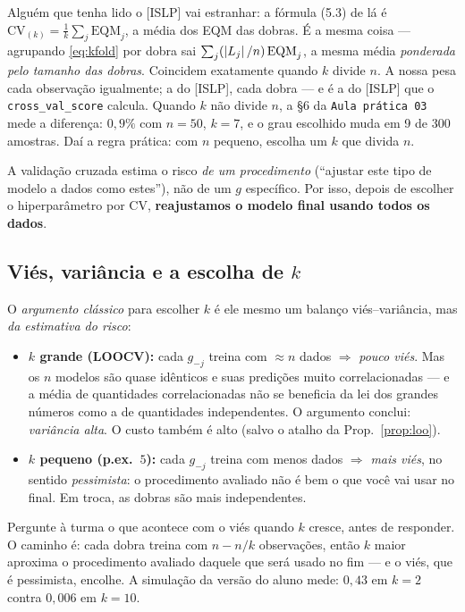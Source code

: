 \documentclass[11pt,a4paper]{article}
\begin{document}
\begin{emsala}
Alguém que tenha lido o [ISLP] vai estranhar: a fórmula (5.3) de lá é
$\mathrm{CV}_{(k)}=\frac1k\sum_j \mathrm{EQM}_j$, a média dos EQM das dobras. É a
mesma coisa --- agrupando \eqref{eq:kfold} por dobra sai
$\sum_j (\left\lvert L_j \right\rvert/n)\,\mathrm{EQM}_j$, a mesma média \emph{ponderada pelo tamanho
das dobras}. Coincidem exatamente quando $k$ divide $n$. A nossa pesa cada
observação igualmente; a do [ISLP], cada dobra --- e é a do [ISLP] que o
\texttt{cross\_val\_score} calcula. Quando $k$ não divide $n$, a §6 da
\texttt{Aula prática 03} mede a diferença: $0{,}9\%$ com $n=50$, $k=7$, e o grau
escolhido muda em 9 de 300 amostras. Daí a regra prática: com $n$ pequeno, escolha
um $k$ que divida $n$.
\end{emsala}

\begin{ideia}
A validação cruzada estima o risco \emph{de um procedimento} (``ajustar este tipo
de modelo a dados como estes''), não de um $g$ específico. Por isso, depois de
escolher o hiperparâmetro por CV, \textbf{reajustamos o modelo final usando todos
os dados}.
\end{ideia}

\subsection{Viés, variância e a escolha de $k$}
O \emph{argumento clássico} para escolher $k$ é ele mesmo um balanço
viés--variância, mas \emph{da estimativa do risco}:
\begin{itemize}[leftmargin=1.4cm]
  \item \textbf{$k$ grande (LOOCV):} cada $g_{-j}$ treina com $\approx n$ dados
        $\Rightarrow$ \emph{pouco viés}. Mas os $n$ modelos são quase idênticos e
        suas predições muito correlacionadas --- e a média de quantidades
        correlacionadas não se beneficia da lei dos grandes números como a de
        quantidades independentes. O argumento conclui: \emph{variância alta}.
        O custo também é alto (salvo o atalho da Prop.~\ref{prop:loo}).
  \item \textbf{$k$ pequeno (p.ex.\ $5$):} cada $g_{-j}$ treina com menos dados
        $\Rightarrow$ \emph{mais viés}, no sentido \emph{pessimista}: o procedimento
        avaliado não é bem o que você vai usar no final. Em troca, as dobras são
        mais independentes.
\end{itemize}

\begin{emsala}
Pergunte à turma o que acontece com o viés quando $k$ cresce, antes de responder.
O caminho é: cada dobra treina com $n-n/k$ observações, então $k$ maior aproxima o
procedimento avaliado daquele que será usado no fim --- e o viés, que é pessimista,
encolhe. A simulação da versão do aluno mede: $0{,}43$ em $k=2$ contra $0{,}006$ em
$k=10$.
\end{emsala}
\end{document}
